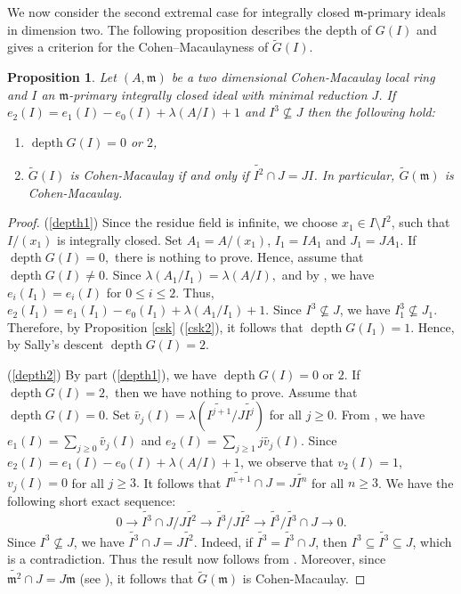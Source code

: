 \documentclass[11pt]{amsart}
\theoremstyle{plain}
\newtheorem{proposition}[theorem]{Proposition}
\newcommand{\m}{\mathfrak{m}}
\newcommand{\wt}{\widetilde}
\newcommand{\depth}{\operatorname{depth}}
\theoremstyle{plain}
\begin{document}
We now consider the second extremal case 
for integrally closed 
$\m$-primary ideals in dimension two. The following proposition describes the depth of 
$G(I)$ and gives a criterion for the Cohen–Macaulayness of 
$\wt{G}(I).$


\begin{proposition}
\label{depth}
    Let $(A, \m) $ be a two dimensional Cohen-Macaulay local ring and $I$ an $\m$-primary integrally closed ideal with minimal reduction $J$. If $e_{2}(I)=e_{1}(I)-e_{0}(I)+\lambda(A/I)+1$ and $I^3\nsubseteq J$ then the following hold:
    \begin{enumerate}[\normalfont(i)]
        \item \label{depth1}  $\depth G(I)=0$ or $2$,
        \item  \label{depth2} $\wt{G}(I)$ is Cohen-Macaulay if and only if $\wt{I^2}\cap J=JI$. In particular, $\wt{G}(\m)$ is Cohen-Macaulay.
    \end{enumerate}
\end{proposition}

\begin{proof}
(\ref{depth1})
Since the residue field is infinite, we choose $x_1 \in I\setminus I^2$, such that $I/(x_1)$ is integrally closed. Set $A_1=A/(x_1)$, $I_1=IA_1$ and  $J_1=JA_1.$   If $\depth G(I)=0,$ there is nothing to prove. Hence, assume that  $\operatorname{depth}G(I) \neq 0.$ Since $\lambda(A_1/I_1)=\lambda(A/I),$ and  by \cite[Proposition 1.2]{rossi2010hilbert}, we have $e_{i}(I_1)=e_{i}(I)$ for $0\leq i\leq 2.$ Thus, $e_{2}(I_1)=e_{1}(I_1)-e_{0}(I_1)+\lambda(A_1/I_1)+1$. Since $I^3\nsubseteq J$, we have $I^3_1\nsubseteq J_{1}$. Therefore, by Proposition \ref{csk} (\ref{csk2}), it follows that $\operatorname{depth}G(I_1)=1.$ Hence, by Sally's descent $\operatorname{depth}G(I)=2.$



\noindent (\ref{depth2})
  By part (\ref{depth1}), we have $\depth G(I)=0 \text{ or }2.$ If $\depth G(I)=2,$ then we have nothing to prove. Assume that $\depth G(I)=0.$ Set $\wt{v_j}(I)=\lambda(\wt{I^{j+1}}/J\wt{I^j})$ for all $j\geq 0.$ From \cite[Equation 3.1]{rossi2010hilbert}, we have $e_1(I)= \displaystyle \sum_{j\geq 0}\wt{v_j}(I)$ and $e_2(I)=\displaystyle \sum_{j\geq 1}j\wt{v_j}(I).$ 
  Since $e_{2}(I)=e_{1}(I)-e_{0}(I)+\lambda(A/I)+1$, we observe that $v_2(I)=1$, $v_j(I)=0$ for all $j\geq 3.$ It follows that  $\wt{I^{n+1}}\cap J=J\wt{I^n}$ for all $n\geq 3$. We have the following short exact sequence: $$0\longrightarrow \wt{I^3}\cap J/J\wt{I^2}\longrightarrow \wt{I^3}/J\wt{I^2}\longrightarrow \wt{I^3}/\wt{I^3}\cap J\to 0.$$ Since $I^3 \nsubseteq  J$, we have $\wt{I^3}\cap J=J\wt{I^2}$.
Indeed, if $\widetilde{I^3} = \widetilde{I^3}\cap J$, then $I^3 \subseteq \widetilde{I^3} \subseteq J$,
which is a contradiction. Thus the result now follows from  \cite[Theorem 1.1]{rossi2010hilbert}.
Moreover, since $\widetilde{\m^2}\cap J = J\m$ (see \cite[2.10]{ankit}), it follows that $\widetilde{G}(\m)$ is Cohen-Macaulay.
   \end{proof}
\end{document}
